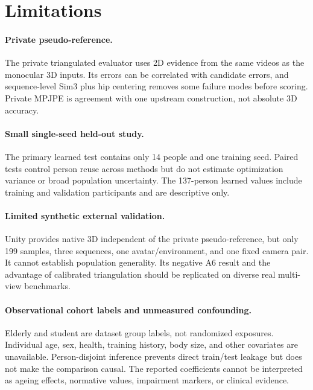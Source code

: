 \section{Limitations}
\label{sec:limitations}

\paragraph{Private pseudo-reference.}
The private triangulated evaluator uses 2D evidence from the same videos as the
monocular 3D inputs. Its errors can be correlated with candidate errors, and
sequence-level Sim3 plus hip centering removes some failure modes before
scoring. Private MPJPE is agreement with one upstream construction, not
absolute 3D accuracy.

\paragraph{Small single-seed held-out study.}
The primary learned test contains only 14 people and one training seed. Paired
tests control person reuse across methods but do not estimate optimization
variance or broad population uncertainty. The 137-person learned values include
training and validation participants and are descriptive only.

\paragraph{Limited synthetic external validation.}
Unity provides native 3D independent of the private pseudo-reference, but only
199 samples, three sequences, one avatar/environment, and one fixed camera
pair. It cannot establish population generality. Its negative A6 result and the
advantage of calibrated triangulation should be replicated on diverse real
multi-view benchmarks.

\paragraph{Observational cohort labels and unmeasured confounding.}
Elderly and student are dataset group labels, not randomized exposures.
Individual age, sex, health, training history, body size, and other covariates
are unavailable. Person-disjoint inference prevents direct train/test leakage
but does not make the comparison causal. The reported coefficients cannot be interpreted as ageing effects,
normative values, impairment markers, or clinical evidence.

